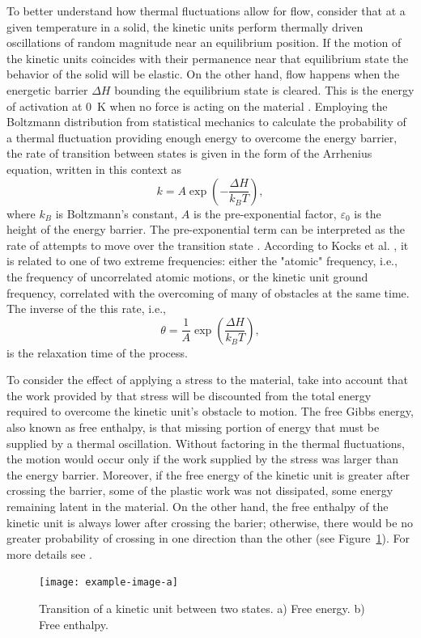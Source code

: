 To better understand how thermal fluctuations allow for flow, consider that at a given temperature in a solid, the kinetic units perform thermally driven oscillations of random magnitude near an equilibrium position.
If the motion of the kinetic units coincides with their permanence near that equilibrium state the behavior of the solid will be elastic.
On the other hand, flow happens when the energetic barrier $\Delta H$ bounding the equilibrium state is cleared.
This is the energy of activation at \SI{0}{\kelvin} when no force is acting on the material \citep{kocks1975thermodynamics}.
Employing the Boltzmann distribution from statistical mechanics to calculate the probability of a thermal fluctuation providing enough energy to overcome the energy barrier, the rate of transition between states is given in the form of the Arrhenius equation, written in this context as
\begin{equation}
	k = A\exp\left(-\frac{\Delta H}{k_BT}\right),
\end{equation}
where $k_B$ is Boltzmann's constant, $A$ is the pre-exponential factor, $\varepsilon_0$ is the height of the energy barrier.
The pre-exponential term can be interpreted as the rate of attempts to move over the transition state \citep{atkins2010atkins}.
According to Kocks et al. \citep{kocks1975thermodynamics}, it is related to one of two extreme frequencies: either the "atomic" frequency, i.e., the frequency of uncorrelated atomic motions, or the kinetic unit ground frequency, correlated with the overcoming of many of obstacles at the same time.
The inverse of the this rate, i.e.,
\begin{equation}
	\theta = \frac{1}{A}\exp\left(\frac{\Delta H}{k_B T}\right),
\end{equation}
is the relaxation time of the process.

To consider the effect of applying a stress to the material, take into account that the work provided by that stress will be discounted from the total energy required to overcome the kinetic unit's obstacle to motion.
The free Gibbs energy, also known as free enthalpy, is that missing portion of energy that must be supplied by a thermal oscillation.
Without factoring in the thermal fluctuations, the motion would occur only if the work supplied by the stress was larger than the energy barrier.
Moreover, if the free energy of the kinetic unit is greater after crossing the barrier, some of the plastic work was not dissipated, some energy remaining latent in the material.
On the other hand, the free enthalpy of the kinetic unit is always lower after crossing the barier; otherwise, there would be no greater probability of crossing in one direction than the other (see Figure~\ref{fig:site_model_theory}).
For more details see \cite{kocks1975thermodynamics}.
\begin{figure}
	\centering
	\texttt{[image: example-image-a]}
	\caption{Transition of a kinetic unit between two states. a) Free energy. b) Free enthalpy.}
\label{fig:site_model_theory}
\end{figure}

